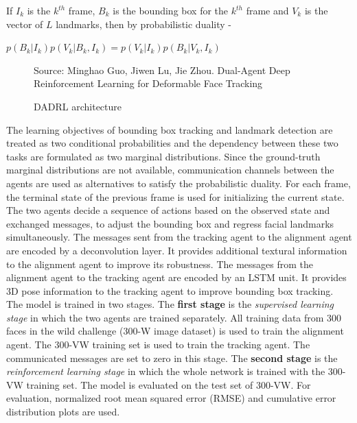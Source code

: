 \documentclass{llncs}
\begin{document}
If $I_k$ is the $k^{th}$ frame, $B_k$ is the bounding box for the $k^{th}$ frame and $V_k$ is the vector of $L$ landmarks, then by probabilistic duality -  

$p\left(B_{k} | I_{k}\right) p\left(V_{k} | B_{k}, I_{k}\right)=p\left(V_{k} | I_{k}\right) p\left(B_{k} | V_{k}, I_{k}\right)$\\

\begin{figure}
%
{Source: Minghao Guo, Jiwen Lu, Jie Zhou. Dual-Agent Deep Reinforcement Learning for Deformable Face Tracking}
\caption{DADRL architecture}
\label{dadrl_architecture}
\end{figure}

The learning objectives of bounding box tracking and landmark detection are treated as two conditional probabilities and the dependency between these two tasks are formulated as two marginal distributions. Since the ground-truth marginal distributions are not available, communication channels between the agents are used as alternatives to satisfy the probabilistic duality. For each frame, the terminal state of the previous frame is used for initializing the current state. The two agents decide a sequence of actions based on the observed state and exchanged messages, to adjust the bounding box and regress facial landmarks simultaneously. The messages sent from the tracking agent to the alignment agent are encoded by a deconvolution layer. It provides additional textural information to the alignment agent to improve its robustness. The messages from the alignment agent to the tracking agent are encoded by an LSTM unit. It provides 3D pose information to the tracking agent to improve bounding box tracking.\\

The model is trained in two stages. The \textbf{first stage} is the \textit{supervised learning stage} in which the two agents are trained separately. All training data from 300 faces in the wild challenge (300-W image dataset) is used to train the alignment agent. The 300-VW training set is used to train the tracking agent. The communicated messages are set to zero in this stage. The \textbf{second stage} is the \textit{reinforcement learning stage} in which the whole network is trained with the 300-VW training set. The model is evaluated on the test set of 300-VW. For evaluation, normalized root mean squared error (RMSE) and cumulative error distribution plots are used.
\end{document}

